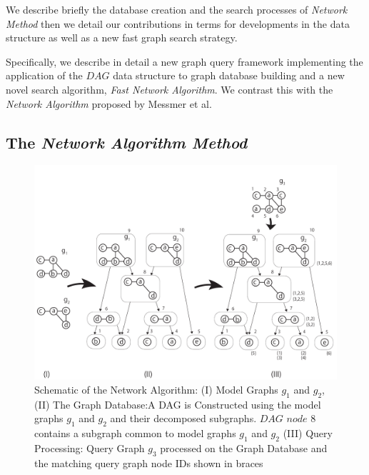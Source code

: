 We describe briefly the database creation and the search processes of  \textit{Network Method} then we detail our contributions in terms for developments in the data structure as well as a new fast graph search strategy. 

Specifically, we describe in detail a new graph query framework implementing the application of the $DAG$ data structure to graph database building and a new novel search algorithm, \textit{ Fast Network Algorithm}. We contrast this with the \textit{Network Algorithm} proposed by Messmer et al.

\subsection{The \textit{Network Algorithm Method}}
 

\begin{figure}
\centering
\includegraphics[width=1.0\textwidth]{dag_construction_query_processing6.pdf}
\caption{Schematic of the Network Algorithm: (I) Model Graphs $g_1$ and $g_2$, (II) The Graph Database:A DAG is Constructed using  the model graphs $g_1$ and $g_2$ and their decomposed subgraphs. $DAG$ $node$ $8$ contains a subgraph common to model graphs $g_1$ and $g_2$  (III) Query Processing: Query Graph $g_3$ processed on the Graph Database and the matching query graph node IDs shown in braces}
\label{fig:fig2}
\end{figure}


